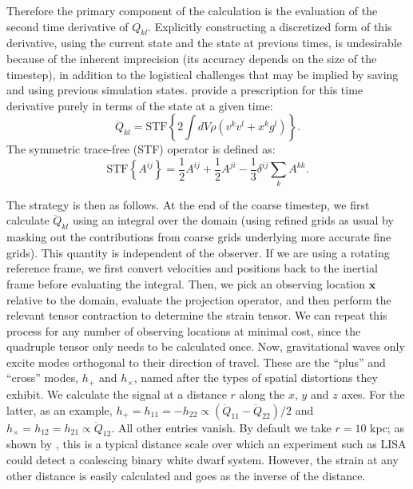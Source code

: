 \documentclass[iop]{../emulateapj}
\begin{document}
Therefore the primary component of the calculation is the evaluation of the second time derivative of $Q_{kl}$.
Explicitly constructing a discretized form of this derivative, using the current state and the state at 
previous times, is undesirable because of the inherent imprecision (its accuracy depends on the size of the timestep),
in addition to the logistical challenges that may be implied by saving and using previous simulation states. 
\citet{blanchet:1990} provide a prescription for this time derivative purely in terms of the state at a given time:
\begin{equation}
  \ddot{Q}_{kl} = \text{STF}\left\{2\int dV \rho (v^k v^l + x^k g^l)\right\}.
\end{equation}
The symmetric trace-free (STF) operator is defined as:
\begin{equation}
  \text{STF}\left\{A^{ij}\right\} = \frac{1}{2}A^{ij} + \frac{1}{2}A^{ji} - \frac{1}{3} \delta^{ij} \sum_{k}A^{kk}.
\end{equation}

The strategy is then as follows. At the end of the coarse timestep, we first calculate $\ddot{Q}_{kl}$
using an integral over the domain (using refined grids as usual by masking out the contributions from 
coarse grids underlying more accurate fine grids). This quantity is independent of the observer. If we 
are using a rotating reference frame, we first convert velocities and positions back to the inertial 
frame before evaluating the integral. Then, 
we pick an observing location $\mathbf{x}$ relative to the domain, evaluate the projection operator, 
and then perform the relevant tensor contraction to determine the strain tensor. We can 
repeat this process for any number of observing locations at minimal cost, since the quadruple tensor 
only needs to be calculated once. Now, gravitational waves only excite modes orthogonal to their 
direction of travel. These are the ``plus'' and ``cross'' modes, $h_+$ and $h_\times$, named after 
the types of spatial distortions they exhibit. We calculate the signal at a distance $r$ along 
the $x$, $y$ and $z$ axes. For the latter, as an example, $h_{+} = h_{11} = -h_{22} \propto (\ddot{Q}_{11} - \ddot{Q}_{22})/2$ and 
$h_{\times} = h_{12} = h_{21} \propto \ddot{Q}_{12}$. All other entries vanish. By default we take $r = 10$ kpc; 
as shown by \citet{loren-aguilar:2005}, this is a typical distance scale over which an 
experiment such as LISA could detect a coalescing binary white dwarf system. 
However, the strain at any other distance is easily calculated and goes as the inverse of the distance.
\end{document}
